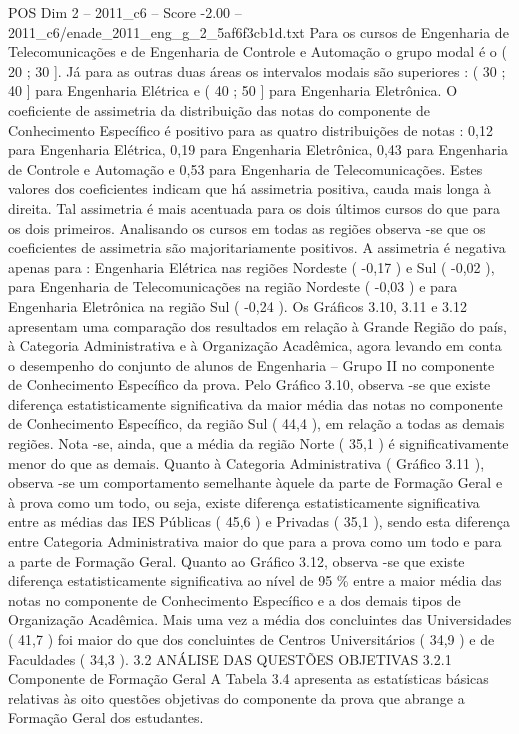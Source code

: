 \begin{textsample}{POS Dim 2 – 2011\_c6 – Score -2.00 – 2011\_c6/enade\_2011\_eng\_g\_2\_5af6f3cb1d.txt}
Para os cursos de Engenharia de Telecomunicações e de Engenharia de Controle e Automação o grupo modal é o ( 20 ; 30 ].
Já para as outras duas áreas os intervalos modais são superiores : ( 30 ; 40 ] para Engenharia Elétrica e ( 40 ; 50 ] para Engenharia Eletrônica.
O coeficiente de assimetria da distribuição das notas do componente de Conhecimento Específico é positivo para as quatro distribuições de notas : 0,12 para Engenharia Elétrica, 0,19 para Engenharia Eletrônica, 0,43 para Engenharia de Controle e Automação e 0,53 para Engenharia de Telecomunicações.
Estes valores dos coeficientes indicam que há assimetria positiva, cauda mais longa à direita.
Tal assimetria é mais acentuada para os dois últimos cursos do que para os dois primeiros.
Analisando os cursos em todas as regiões observa -se que os coeficientes de assimetria são majoritariamente positivos.
A assimetria é negativa apenas para : Engenharia Elétrica nas regiões Nordeste ( -0,17 ) e Sul ( -0,02 ), para Engenharia de Telecomunicações na região Nordeste ( -0,03 ) e para Engenharia Eletrônica na região Sul ( -0,24 ).
Os Gráficos 3.10, 3.11 e 3.12 apresentam uma comparação dos resultados em relação à Grande Região do país, à Categoria Administrativa e à Organização Acadêmica, agora levando em conta o desempenho do conjunto de alunos de Engenharia – Grupo II no componente de Conhecimento Específico da prova.
Pelo Gráfico 3.10, observa -se que existe diferença estatisticamente significativa da maior média das notas no componente de Conhecimento Específico, da região Sul ( 44,4 ), em relação a todas as demais regiões.
Nota -se, ainda, que a média da região Norte ( 35,1 ) é significativamente menor do que as demais.
Quanto à Categoria Administrativa ( Gráfico 3.11 ), observa -se um comportamento semelhante àquele da parte de Formação Geral e à prova como um todo, ou seja, existe diferença estatisticamente significativa entre as médias das IES Públicas ( 45,6 ) e Privadas ( 35,1 ), sendo esta diferença entre Categoria Administrativa maior do que para a prova como um todo e para a parte de Formação Geral.
Quanto ao Gráfico 3.12, observa -se que existe diferença estatisticamente significativa ao nível de 95 \% entre a maior média das notas no componente de Conhecimento Específico e a dos demais tipos de Organização Acadêmica.
Mais uma vez a média dos concluintes das Universidades ( 41,7 ) foi maior do que dos concluintes de Centros Universitários ( 34,9 ) e de Faculdades ( 34,3 ). 3.2 ANÁLISE DAS QUESTÕES OBJETIVAS 3.2.1 Componente de Formação Geral A Tabela 3.4 apresenta as estatísticas básicas relativas às oito questões objetivas do componente da prova que abrange a Formação Geral dos estudantes.

\end{textsample}
